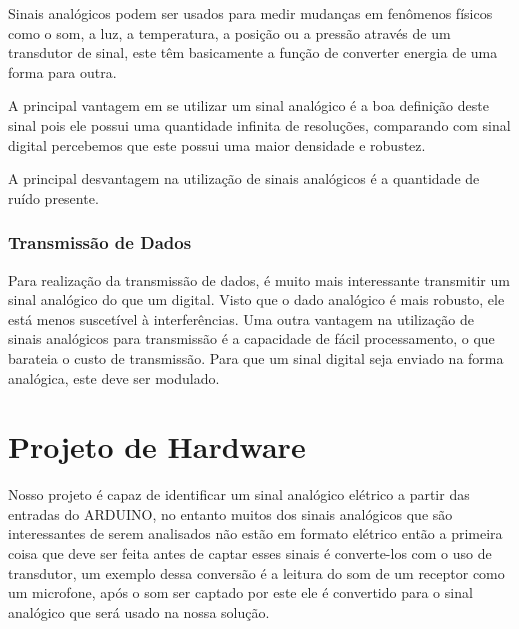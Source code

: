 \documentclass[12pt,a4paper]{report}
\begin{document}
Sinais analógicos podem ser usados para medir mudanças em fenômenos físicos como o som, a luz, a temperatura, a posição ou a pressão através de um transdutor de sinal, este têm basicamente a função de converter energia de uma forma para outra. 

A principal vantagem em se utilizar um sinal analógico é a boa definição deste sinal pois ele possui uma quantidade infinita de resoluções, comparando com sinal digital percebemos que este possui uma maior densidade e robustez.

A principal desvantagem na utilização de sinais analógicos é a quantidade de ruído presente.


\subsection{Transmissão de Dados}

Para realização da transmissão de dados, é muito mais interessante transmitir um sinal analógico do que um digital. Visto que o dado analógico é mais robusto, ele está menos suscetível à interferências. Uma outra vantagem na utilização de sinais analógicos para transmissão é a capacidade de fácil processamento, o que barateia o custo de transmissão. Para que um sinal digital seja enviado na forma analógica, este deve ser modulado.

\chapter{Projeto de Hardware}



Nosso projeto é capaz de identificar um sinal analógico elétrico a partir das entradas do ARDUINO, no entanto muitos dos sinais analógicos que são interessantes de serem analisados não estão em formato elétrico então a primeira coisa que deve ser feita antes de captar esses sinais é converte-los com o uso de transdutor, um exemplo dessa conversão é a leitura do som de um receptor como um microfone, após o som ser captado por este ele é convertido para o sinal analógico que será usado na nossa solução.
\end{document}

